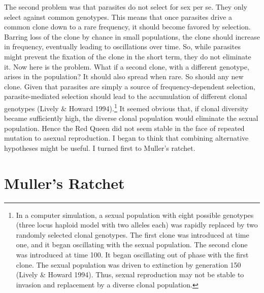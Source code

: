 \documentclass[
  letterpaper,
]{book}
\begin{document}
The second problem was that parasites do not select for sex per se. They
only select against common genotypes. This means that once parasites
drive a common clone down to a rare frequency, it should become favored
by selection. Barring loss of the clone by chance in small populations,
the clone should increase in frequency, eventually leading to
oscillations over time. So, while parasites might prevent the fixation
of the clone in the short term, they do not eliminate it. Now here is
the problem. What if a second clone, with a different genotype, arises
in the population? It should also spread when rare. So should any new
clone. Given that parasites are simply a source of frequency-dependent
selection, parasite-mediated selection should lead to the accumulation
of different clonal genotypes (Lively \& Howard 1994).\footnote{In a
  computer simulation, a sexual population with eight possible genotypes
  (three locus haploid model with two alleles each) was rapidly replaced
  by two randomly selected clonal genotypes. The first clone was
  introduced at time one, and it began oscillating with the sexual
  population. The second clone was introduced at time 100. It began
  oscillating out of phase with the first clone. The sexual population
  was driven to extinction by generation 150 (Lively \& Howard 1994).
  Thus, sexual reproduction may not be stable to invasion and
  replacement by a diverse clonal population.} It seemed obvious that,
if clonal diversity became sufficiently high, the diverse clonal
population would eliminate the sexual population. Hence the Red Queen
did not seem stable in the face of repeated mutation to asexual
reproduction. I began to think that combining alternative hypotheses
might be useful. I turned first to Muller's ratchet.

\section{Muller's Ratchet}\label{mullers-ratchet}
\end{document}
